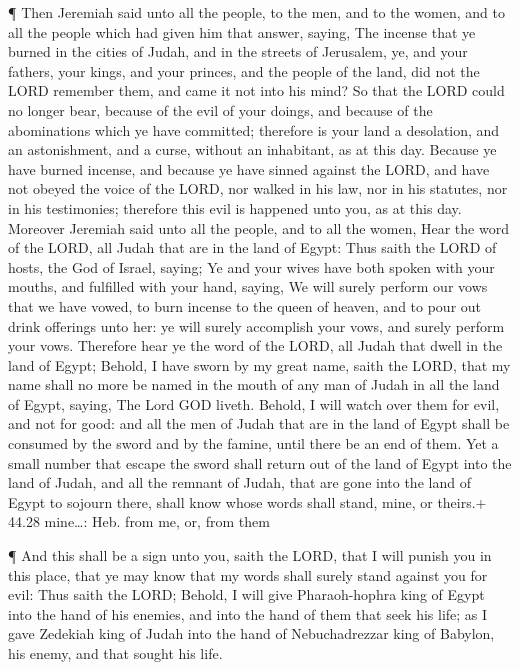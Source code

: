  ¶ Then Jeremiah said unto all the people, to the men, and
to the women, and to all the people which had given him that answer,
saying,  The incense that ye burned in the cities of Judah,
and in the streets of Jerusalem, ye, and your fathers, your kings, and
your princes, and the people of the land, did not the LORD remember
them, and came it not into his mind?  So that the LORD
could no longer bear, because of the evil of your doings, and because of
the abominations which ye have committed; therefore is your land a
desolation, and an astonishment, and a curse, without an inhabitant, as
at this day.  Because ye have burned incense, and because
ye have sinned against the LORD, and have not obeyed the voice of the
LORD, nor walked in his law, nor in his statutes, nor in his
testimonies; therefore this evil is happened unto you, as at this day.
 Moreover Jeremiah said unto all the people, and to all the
women, Hear the word of the LORD, all Judah that are in the land of
Egypt:  Thus saith the LORD of hosts, the God of Israel,
saying; Ye and your wives have both spoken with your mouths, and
fulfilled with your hand, saying, We will surely perform our vows that
we have vowed, to burn incense to the queen of heaven, and to pour out
drink offerings unto her: ye will surely accomplish your vows, and
surely perform your vows.  Therefore hear ye the word of
the LORD, all Judah that dwell in the land of Egypt; Behold, I have
sworn by my great name, saith the LORD, that my name shall no more be
named in the mouth of any man of Judah in all the land of Egypt, saying,
The Lord GOD liveth.  Behold, I will watch over them for
evil, and not for good: and all the men of Judah that are in the land of
Egypt shall be consumed by the sword and by the famine, until there be
an end of them.  Yet a small number that escape the sword
shall return out of the land of Egypt into the land of Judah, and all
the remnant of Judah, that are gone into the land of Egypt to sojourn
there, shall know whose words shall stand, mine, or theirs.+ 44.28
mine\ldots: Heb. from me, or, from them

 ¶ And this shall be a sign unto you, saith the LORD, that
I will punish you in this place, that ye may know that my words shall
surely stand against you for evil:  Thus saith the LORD;
Behold, I will give Pharaoh-hophra king of Egypt into the hand of his
enemies, and into the hand of them that seek his life; as I gave
Zedekiah king of Judah into the hand of Nebuchadrezzar king of Babylon,
his enemy, and that sought his life.

